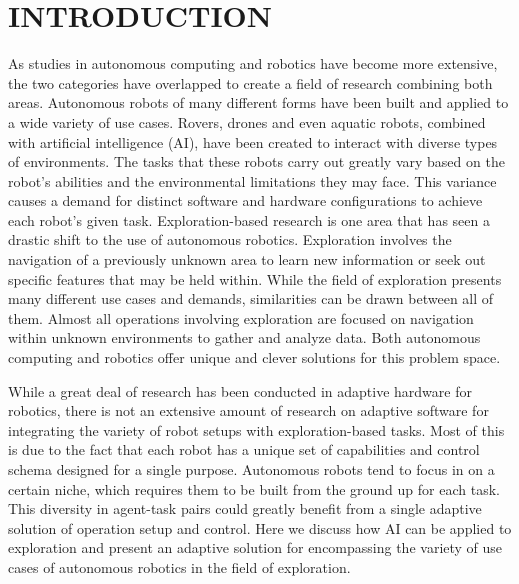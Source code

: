 

\chapter{INTRODUCTION} \label{ch:introduction}
As studies in autonomous computing and robotics have become more extensive, the two categories have overlapped to create a field of research combining both areas.
Autonomous robots of many different forms have been built and applied to a wide variety of use cases.
Rovers, drones and even aquatic robots, combined with artificial intelligence (AI), have been created to interact with diverse types of environments.
The tasks that these robots carry out greatly vary based on the robot's abilities and the environmental limitations they may face.
This variance causes a demand for distinct software and hardware configurations to achieve each robot's given task.
Exploration-based research is one area that has seen a drastic shift to the use of autonomous robotics.
Exploration involves the navigation of a previously unknown area to learn new information or seek out specific features that may be held within.
While the field of exploration presents many different use cases and demands, similarities can be drawn between all of them.
Almost all operations involving exploration are focused on navigation within unknown environments to gather and analyze data.
Both autonomous computing and robotics offer unique and clever solutions for this problem space.

While a great deal of research has been conducted in adaptive hardware for robotics, there is not an extensive amount of research on adaptive software for integrating the variety of robot setups with exploration-based tasks.
Most of this is due to the fact that each robot has a unique set of capabilities and control schema designed for a single purpose.
Autonomous robots tend to focus in on a certain niche, which requires them to be built from the ground up for each task.
This diversity in agent-task pairs could greatly benefit from a single adaptive solution of operation setup and control.
Here we discuss how AI can be applied to exploration and present an adaptive solution for encompassing the variety of use cases of autonomous robotics in the field of exploration.


